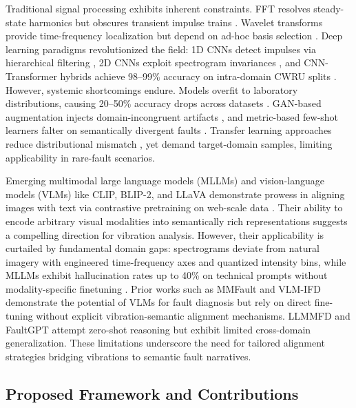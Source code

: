Traditional signal processing exhibits inherent constraints. FFT resolves steady-state harmonics but obscures transient impulse trains \cite{cite10}. Wavelet transforms provide time-frequency localization but depend on ad-hoc basis selection \cite{cite11}. Deep learning paradigms revolutionized the field: 1D CNNs detect impulses via hierarchical filtering \cite{cite12}, 2D CNNs exploit spectrogram invariances \cite{cite13}, and CNN-Transformer hybrids achieve 98--99\% accuracy on intra-domain CWRU splits \cite{cite15}. However, systemic shortcomings endure. Models overfit to laboratory distributions, causing 20--50\% accuracy drops across datasets \cite{cite17}. GAN-based augmentation injects domain-incongruent artifacts \cite{cite18}, and metric-based few-shot learners falter on semantically divergent faults \cite{cite19}. Transfer learning approaches reduce distributional mismatch \cite{cite25}, yet demand target-domain samples, limiting applicability in rare-fault scenarios.

Emerging multimodal large language models (MLLMs) and vision-language models (VLMs) like CLIP, BLIP-2, and LLaVA demonstrate prowess in aligning images with text via contrastive pretraining on web-scale data \cite{cite20}\cite{cite21}. Their ability to encode arbitrary visual modalities into semantically rich representations suggests a compelling direction for vibration analysis. However, their applicability is curtailed by fundamental domain gaps: spectrograms deviate from natural imagery with engineered time-frequency axes and quantized intensity bins, while MLLMs exhibit hallucination rates up to 40\% on technical prompts without modality-specific finetuning \cite{cite27}\cite{cite28}\cite{cite29}. Prior works such as MMFault \cite{cite23} and VLM-IFD \cite{cite24} demonstrate the potential of VLMs for fault diagnosis but rely on direct fine-tuning without explicit vibration-semantic alignment mechanisms. LLMMFD \cite{cite25} and FaultGPT \cite{cite26} attempt zero-shot reasoning but exhibit limited cross-domain generalization. These limitations underscore the need for tailored alignment strategies bridging vibrations to semantic fault narratives.

\subsection{Proposed Framework and Contributions}

